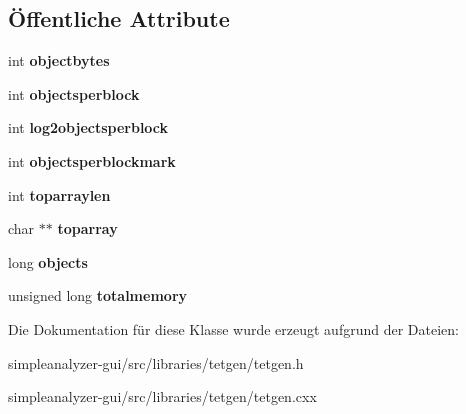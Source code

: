 \subsection*{Öffentliche Attribute}
\begin{DoxyCompactItemize}
\item 
\hypertarget{classtetgenmesh_1_1arraypool_a469ac2a2833a25faa0f99ab011122e2d}{int {\bfseries objectbytes}}\label{classtetgenmesh_1_1arraypool_a469ac2a2833a25faa0f99ab011122e2d}

\item 
\hypertarget{classtetgenmesh_1_1arraypool_a2b6ba46461d5c8f0e6043bdd111246dd}{int {\bfseries objectsperblock}}\label{classtetgenmesh_1_1arraypool_a2b6ba46461d5c8f0e6043bdd111246dd}

\item 
\hypertarget{classtetgenmesh_1_1arraypool_ab61ada3b2fc49879a160a919e9994279}{int {\bfseries log2objectsperblock}}\label{classtetgenmesh_1_1arraypool_ab61ada3b2fc49879a160a919e9994279}

\item 
\hypertarget{classtetgenmesh_1_1arraypool_a662031b2a9978bfc3be39ce90bd3bf0a}{int {\bfseries objectsperblockmark}}\label{classtetgenmesh_1_1arraypool_a662031b2a9978bfc3be39ce90bd3bf0a}

\item 
\hypertarget{classtetgenmesh_1_1arraypool_aa9ced327d45678f31b4e7f8e75aff861}{int {\bfseries toparraylen}}\label{classtetgenmesh_1_1arraypool_aa9ced327d45678f31b4e7f8e75aff861}

\item 
\hypertarget{classtetgenmesh_1_1arraypool_a3a4e28a88226f1dd777773fe45094650}{char $\ast$$\ast$ {\bfseries toparray}}\label{classtetgenmesh_1_1arraypool_a3a4e28a88226f1dd777773fe45094650}

\item 
\hypertarget{classtetgenmesh_1_1arraypool_a23345232309fd68d2e3afa6d017299b0}{long {\bfseries objects}}\label{classtetgenmesh_1_1arraypool_a23345232309fd68d2e3afa6d017299b0}

\item 
\hypertarget{classtetgenmesh_1_1arraypool_af264f265d5752e75f50adea472ecd59f}{unsigned long {\bfseries totalmemory}}\label{classtetgenmesh_1_1arraypool_af264f265d5752e75f50adea472ecd59f}

\end{DoxyCompactItemize}


Die Dokumentation für diese Klasse wurde erzeugt aufgrund der Dateien\-:\begin{DoxyCompactItemize}
\item 
simpleanalyzer-\/gui/src/libraries/tetgen/tetgen.\-h\item 
simpleanalyzer-\/gui/src/libraries/tetgen/tetgen.\-cxx\end{DoxyCompactItemize}
